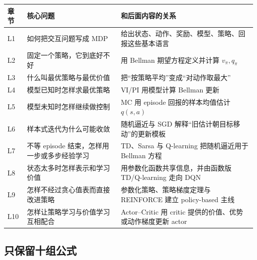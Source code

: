\documentclass[11pt,a4paper,fontset=fandol]{ctexart}
\begin{document}
\begin{center}
\begin{tabularx}{\textwidth}{
  >{\raggedright\arraybackslash}p{}
  >{\raggedright\arraybackslash}p{}
  X}
\toprule
章节 & 核心问题 & 和后面内容的关系\\
\midrule
L1 & 如何把交互问题写成 MDP &
给出状态、动作、奖励、模型、策略、回报这些基本语言\\
L2 & 固定一个策略，它到底好不好 &
用 Bellman 期望方程定义并计算 \(v_\pi,q_\pi\)\\
L3 & 什么叫最优策略与最优价值 &
把“按策略平均”变成“对动作取最大”\\
L4 & 模型已知时怎样求最优策略 &
VI/PI 用模型计算 Bellman 更新\\
L5 & 模型未知时怎样继续做控制 &
MC 用 episode 回报的样本均值估计 \(q(s,a)\)\\
L6 & 样本式迭代为什么可能收敛 &
随机逼近与 SGD 解释“旧估计朝目标移动”的更新模板\\
L7 & 不等 episode 结束，怎样用一步或多步经验学习 &
TD、Sarsa 与 Q-learning 把随机逼近用于 Bellman 方程\\
L8 & 状态太多时怎样表示和学习价值 &
用参数化函数共享信息，并由函数版 TD/Q-learning 走向 DQN\\
L9 & 怎样不经过贪心值表而直接改进策略 &
参数化策略、策略梯度定理与 REINFORCE 建立 policy-based 主线\\
L10 & 怎样让策略学习与价值学习互相配合 &
Actor--Critic 用 critic 提供的价值、优势或动作梯度更新 actor\\
\bottomrule
\end{tabularx}
\end{center}

\subsection*{只保留十组公式}
\end{document}
